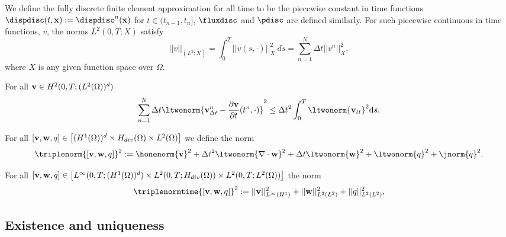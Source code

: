 We define the fully discrete finite element approximation for all time to be the piecewise constant in time functions $\dispdisc(t,{\bf x})  := \dispdisc^n({\bf x})$ for $t \in (t_{n-1}, t_n]$, $\fluxdisc$ and $\pdisc$ are defined similarly. For such piecewise continuous in time functions, $v$, the norms $L^2(0,T; X)$ satisfy
\begin{equation*}
 || v ||_{(L^2; X) }= \int_0^T || v (s,\cdot) ||^2_X ~ds = \sum_{n=1}^N \Delta t   || v^n||^2_X,
\end{equation*}
where $X$ is any given function space over $\Omega$.

For all ${\bf v} \in H^2(0,T; (L^2(\Omega))^d)$
\begin{equation}
\label{eq: time deriv error}
\sum_{n=1}^{N} \Delta t \ltwonorm{{\bf v}_{\Delta t}^{n} - \frac{\partial {\bf v}}{\partial t} (t^n,\cdot) }^{2}
\leq \Delta t^{2}  \int_{0}^{T} \ltwonorm{{\bf v}_{tt} }^{2} \mbox{d}s.
\end{equation}

For all $[{\bf v},{\bf w},q]  \in \left[( H^{1}(\Omega))^d \times H_{div} (\Omega) \times L^2 (\Omega) \right]$ we define the norm
\begin{equation}
\label{eqn:triple_norm}
\triplenorm{[{\bf v},{\bf w},q] }^2
:=\honenorm{{\bf v}}^2 + {\Delta t}^2\ltwonorm{\nabla \cdot {\bf w}}^2 + {\Delta t} \ltwonorm{{\bf w}}^2  + \ltwonorm{q}^2 + \jnorm{q}^2.
\end{equation}

For all $[{\bf v},{\bf w},q]  \in \left[L^{\infty} (0,T; ( H^{1}(\Omega))^d ) \times L^2(0,T;H_{div} (\Omega)) \times L^2(0,T; L^2(\Omega)) \right]$  the norm
\begin{equation}
\label{eqn:triple_norm time}
\triplenormtime{[{\bf v},{\bf w},q] }^2
:=  || {\bf v} ||_{L^{\infty}(H^1)}^2 + || {\bf w} ||_{L^{2}(L^2)}^2 + || q ||_{L^2(L^2)}^2,
\end{equation}



\subsection{Existence and uniqueness}
\label{sec:existence_uniqueness}

